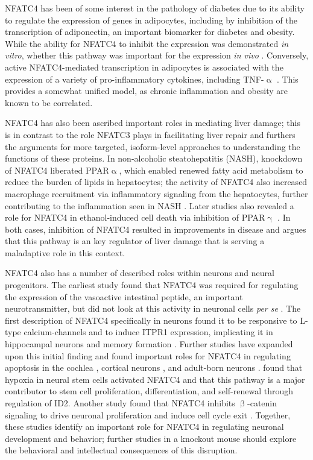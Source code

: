 NFATC4 has been of some interest in the pathology of diabetes due to its ability to regulate the expression of genes in adipocytes, including by inhibition of the transcription of adiponectin, an important biomarker for diabetes and obesity. While the ability for NFATC4 to inhibit the expression was demonstrated \textit{in vitro}, whether this pathway was important for the expression \textit{in vivo} \citep{Kim2006}. Conversely, active NFATC4\hyp{}mediated transcription in adipocytes is associated with the expression of a variety of pro\hyp{}inflammatory cytokines, including TNF\hyp{}$\upalpha$ \citep{Kim2008}. This provides a somewhat unified model, as chronic inflammation and obesity are known to be correlated. 

NFATC4 has also been ascribed important roles in mediating liver damage; this is in contrast to the role NFATC3 plays in facilitating liver repair and furthers the arguments for more targeted, isoform\hyp{}level approaches to understanding the functions of these proteins. In non\hyp{}alcoholic steatohepatitis (NASH), knockdown of NFATC4 liberated PPAR$\upalpha$, which enabled renewed fatty acid metabolism to reduce the burden of lipids in hepatocytes; the activity of NFATC4 also increased macrophage recruitment via inflammatory signaling from the hepatocytes, further contributing to the inflammation seen in NASH \citep{Du2020}. Later studies also revealed a role for NFATC4 in ethanol\hyp{}induced cell death via inhibition of PPAR$\upgamma$  \citep{Wu2021}. In both cases, inhibition of NFATC4 resulted in improvements in disease and argues that this pathway is an key regulator of liver damage that is serving a maladaptive role in this context.

NFATC4 also has a number of described roles within neurons and neural progenitors. The earliest study found that NFATC4 was required for regulating the expression of the vasoactive intestinal peptide, an important neurotransmitter, but did not look at this activity in neuronal cells \textit{per se} \citep{Symes1998}. The first description of NFATC4 specifically in neurons found it to be responsive to L\hyp{}type calcium\hyp{}channels and to induce ITPR1 expression, implicating it in hippocampal neurons and memory formation \citep{Graef1999}. Further studies have expanded upon this initial finding and found important roles for NFATC4 in regulating apoptosis in the cochlea \citep{Luoma2008, Benedito2005}, cortical neurons \citep{Vashishta2009}, and adult\hyp{}born neurons \citep{Quadrato2012}. \citet{Moreno2015} found that hypoxia in neural stem cells activated NFATC4 and that this pathway is a major contributor to stem cell proliferation, differentiation, and self\hyp{}renewal through regulation of ID2. Another study found that NFATC4 inhibits $\upbeta$\hyp{}catenin signaling to drive neuronal proliferation and induce cell cycle exit \citep{Huang2011}. Together, these studies identify an important role for NFATC4 in regulating neuronal development and behavior; further studies in a knockout mouse should explore the behavioral and intellectual consequences of this disruption.

